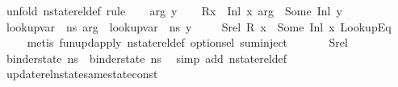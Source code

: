 \begin{isabellebody}
%
\isadelimproof
%
\endisadelimproof
%
\isatagproof
{}\isamarkupfalse%
\ {\isacharparenleft}{\kern0pt}unfold\ nstate{\isacharunderscore}{\kern0pt}rel{\isacharunderscore}{\kern0pt}def{\isacharcomma}{\kern0pt}\ rule{\isacharplus}{\kern0pt}{\isacharparenright}{\kern0pt}\isanewline
\ \ \isamarkupfalse%
\ arg\ y\isanewline
\ \ \isamarkupfalse%
\ {\isachardoublequoteopen}{\isacharparenleft}{\kern0pt}R{\isacharparenleft}{\kern0pt}x\ {\isasymmapsto}\ {\isacharparenleft}{\kern0pt}Inl\ x{}{\isacharparenright}{\kern0pt}{\isacharparenright}{\kern0pt}{\isacharparenright}{\kern0pt}\ arg\ {\isacharequal}{\kern0pt}\ Some\ {\isacharparenleft}{\kern0pt}Inl\ y{\isacharparenright}{\kern0pt}{\isachardoublequoteclose}\isanewline
\ \ \isamarkupfalse%
\ {\isachardoublequoteopen}lookup{\isacharunderscore}{\kern0pt}var\ {\isasymLambda}\ ns{}\ arg\ {\isacharequal}{\kern0pt}\ lookup{\isacharunderscore}{\kern0pt}var\ {\isasymLambda}{\isacharprime}{\kern0pt}\ ns{}\ y{\isachardoublequoteclose}\isanewline
\ \ \ \isamarkupfalse%
\ Srel\ {\isacartoucheopen}R\ x\ {\isacharequal}{\kern0pt}\ Some\ {\isacharparenleft}{\kern0pt}Inl\ x{}{\isacharparenright}{\kern0pt}{\isacartoucheclose}\ LookupEq\isanewline
\ \ \ \isamarkupfalse%
\ {\isacharparenleft}{\kern0pt}metis\ fun{\isacharunderscore}{\kern0pt}upd{\isacharunderscore}{\kern0pt}apply\ nstate{\isacharunderscore}{\kern0pt}rel{\isacharunderscore}{\kern0pt}def\ option{\isachardot}{\kern0pt}sel\ sum{\isachardot}{\kern0pt}inject{\isacharparenleft}{\kern0pt}{}{\isacharparenright}{\kern0pt}{\isacharparenright}{\kern0pt}\ \ \ \isanewline
{}\isamarkupfalse%
\isanewline
\ \ \isamarkupfalse%
\ Srel\ \isamarkupfalse%
\ {\isachardoublequoteopen}binder{\isacharunderscore}{\kern0pt}state\ ns{}\ {\isacharequal}{\kern0pt}\ binder{\isacharunderscore}{\kern0pt}state\ ns{}{\isachardoublequoteclose}\ \isamarkupfalse%
\ {\isacharparenleft}{\kern0pt}simp\ add{\isacharcolon}{\kern0pt}\ nstate{\isacharunderscore}{\kern0pt}rel{\isacharunderscore}{\kern0pt}def{\isacharparenright}{\kern0pt}\isanewline
{}\isamarkupfalse%
%
\endisatagproof
{\isafoldproof}%
%
\isadelimproof
\isanewline
%
\endisadelimproof
\isanewline
{}\isamarkupfalse%
\ update{\isacharunderscore}{\kern0pt}rel{\isacharunderscore}{\kern0pt}nstate{\isacharunderscore}{\kern0pt}same{\isacharunderscore}{\kern0pt}state{\isacharunderscore}{\kern0pt}const{\isacharcolon}{\kern0pt}\isanewline

\end{isabellebody}
